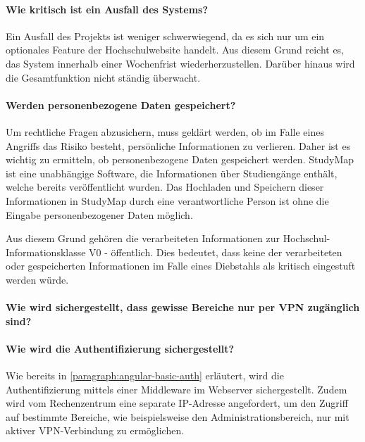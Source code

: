 \paragraph*{Wie kritisch ist ein Ausfall des Systems?}
Ein Ausfall des Projekts ist weniger schwerwiegend, da es sich nur um ein optionales Feature der Hochschulwebsite handelt. Aus diesem Grund reicht es, das System innerhalb einer Wochenfrist wiederherzustellen. Darüber hinaus wird die Gesamtfunktion nicht ständig überwacht.

\paragraph*{Werden personenbezogene Daten gespeichert?}
Um rechtliche Fragen abzusichern, muss geklärt werden, ob im Falle eines Angriffs das Risiko besteht, persönliche Informationen zu verlieren. Daher ist es wichtig zu ermitteln, ob personenbezogene Daten gespeichert werden. StudyMap ist eine unabhängige Software, die Informationen über Studiengänge enthält, welche bereits veröffentlicht wurden. Das Hochladen und Speichern dieser Informationen in StudyMap durch eine verantwortliche Person ist ohne die Eingabe personenbezogener Daten möglich.

Aus diesem Grund gehören die verarbeiteten Informationen zur Hochschul-Informationsklasse \glqq V0 - öffentlich\grqq{}. Dies bedeutet, dass keine der verarbeiteten oder gespeicherten Informationen im Falle eines Diebstahls als kritisch eingestuft werden würde.

\paragraph*{Wie wird sichergestellt, dass gewisse Bereiche nur per VPN zugänglich sind?}

\paragraph*{Wie wird die Authentifizierung sichergestellt?}
Wie bereits in \autoref{paragraph:angular-basic-auth} erläutert, wird die Authentifizierung mittels einer Middleware im Webserver sichergestellt. Zudem wird vom Rechenzentrum eine separate IP-Adresse angefordert, um den Zugriff auf bestimmte Bereiche, wie beispielsweise den Administrationsbereich, nur mit aktiver VPN-Verbindung zu ermöglichen. %

